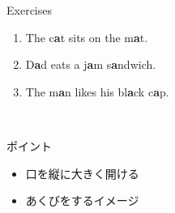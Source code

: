 \documentclass[aspectratio=169,xcolor={dvipsnames,table}]{beamer}
\begin{document}
\begin{frame}[plain]{Exercises}
\LARGE

\begin{enumerate}
 \item The c\textcolor{NavyBlue}{\bfseries a}t sits on the m\textcolor{NavyBlue}{\bfseries a}t.
 \item D\textcolor{NavyBlue}{\bfseries a}d eats a j\textcolor{NavyBlue}{\bfseries a}m s\textcolor{NavyBlue}{\bfseries a}ndwich.
 \item The m\textcolor{NavyBlue}{\bfseries a}n likes his bl\textcolor{NavyBlue}{\bfseries a}ck c\textcolor{NavyBlue}{\bfseries a}p.
\end{enumerate}
\end{frame}
\begin{frame}
\centering
  \textcolor{white}{\Huge\bfseries Today's Pronunciation}\pause

 \vspace{30pt}

  \textcolor{white}{\Huge\bfseries \textipa{/\textscripta /}}
\end{frame}
\begin{frame}[plain]{\textipa{/\textscripta /}}

\Huge
 \textipa{/\textscripta /}

\vspace*{20pt}

\normalsize
ポイント

\begin{itemize}
 \item 口を縦に大きく開ける
 \item あくびをするイメージ
\end{itemize}
\end{frame}
\end{document}
